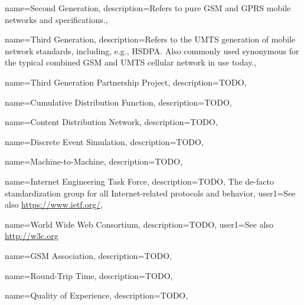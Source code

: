 

{
  name=Second Generation,
  description={Refers to pure \acrshort{GSM} and \acrshort{GPRS} mobile networks and specifications.},
}

{
  name=Third Generation,
  description={Refers to the \acrshort{UMTS} generation of mobile network standards, including, e.g., \acrshort{HSDPA}. Also commonly used synonymous for the typical combined \acrshort{GSM} and \acrshort{UMTS} cellular network in use today.},
}

{
  name=Third Generation Partnership Project,
  description={TODO},
}

{
  name=Cumulative Distribution Function,
  description={TODO},
}

{
  name=Content Distribution Network,
  description={TODO},
}

{
  name=Discrete Event Simulation,
  description={TODO},
}


{
  name=Machine-to-Machine,
  description={TODO},
}

{
  name=Internet Engineering Task Force,
  description={TODO, The de-facto standardization group for all Internet-related protocols and behavior},
  user1={See also \url{https://www.ietf.org/}},
}


{
  name=World Wide Web Consortium,
  description={TODO},
  user1={See also \url{http://w3c.org}}
}

{
  name=\acrshort{GSM} Association,
  description={TODO},
}

{
  name=Round-Trip Time,
  description={TODO},
}

{
  name=Quality of Experience,
  description={TODO},
}

